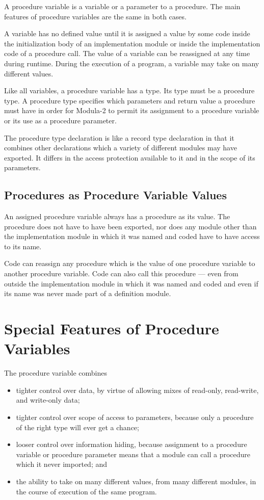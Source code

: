 A procedure variable is a variable or a parameter to a procedure. 
The main features of procedure variables are the same in both cases. 

A variable has no defined value until it is assigned a value by some
code inside the initialization body
of an implementation module or inside the implementation code of a procedure
call.  The value of a variable can be reassigned at any time
during runtime.  During the execution of a program, a variable may take on many
different values.

Like all variables, a procedure variable has a type. Its type must be a 
procedure
type.  A procedure type specifies which parameters and return value a procedure
must have in order for Modula-2 to permit its assignment to a procedure
variable or its use as a procedure parameter.

The procedure type declaration is like a record type declaration in that it
combines other declarations which a variety of different modules may have
exported.  It differs in the access protection available to it and in the scope
of its parameters.

\subsection{Procedures as Procedure Variable Values}

An assigned procedure variable always has a procedure as its value.  The
procedure does not have to have been exported, nor does any module other
than the implementation module
in which it was named and coded have to have access to its name.

Code can reassign any procedure which is the value of one procedure variable to
another procedure variable.  Code can also call this procedure --- even from
outside the implementation module in which it was named and coded and even if its
name was never made part of a definition module.

\section{Special Features of Procedure Variables}

The procedure variable combines
\begin{itemize}
 \item
  tighter control over data, by virtue of allowing mixes of read-only,
  read-write, and write-only data;
 \item
  tighter control over scope of access to parameters, because only a procedure
  of the right type will ever get a chance;
 \item
  looser control over information hiding, because assignment to a procedure
  variable or procedure parameter means that a module can call a procedure
  which it never imported; and
 \item
  the ability to take on many different values, from many different modules,
  in the course of execution of the same program.
\end{itemize}

